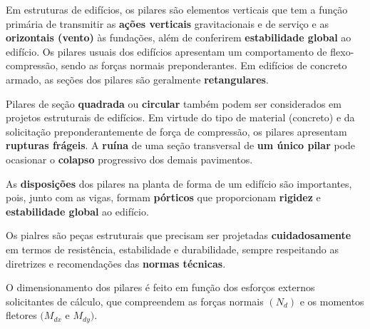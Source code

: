 Em estruturas de edifícios, os pilares são elementos verticais que tem a função primária de transmitir as \textbf{ações verticais} gravitacionais e de serviço e as \textbf{orizontais (vento)} às fundações, além de conferirem \textbf{estabilidade global} ao edifício. Os pilares usuais dos edifícios apresentam um comportamento de flexo-compressão, sendo as forças normais preponderantes.
Em edifícios de concreto armado, as seções dos pilares são geralmente \textbf{retangulares}.


Pilares de seção \textbf{quadrada} ou \textbf{circular} também podem ser considerados em projetos estruturais de edifícios.
Em virtude do tipo de material (concreto) e da solicitação preponderantemente de força de compressão, os pilares apresentam \textbf{rupturas frágeis}. A \textbf{ruína} de uma seção transversal de \textbf{um único pilar} pode ocasionar o \textbf{colapso} progressivo dos demais pavimentos.

As \textbf{disposições} dos pilares na planta de forma de um edifício são importantes, pois, junto com as vigas, formam \textbf{pórticos} que proporcionam \textbf{rigidez} e \textbf{estabilidade global} ao edifício.

Os pialres são peças estruturais que precisam ser projetadas \textbf{cuidadosamente} em termos de resistência, estabilidade e durabilidade, sempre respeitando as diretrizes e recomendações das \textbf{normas técnicas}.

O dimensionamento dos pilares é feito em função dos esforços externos solicitantes de cálculo, que compreendem as forças normais $(N_d)$ e os momentos fletores $(M_{dx}$ e $M_{dy})$.
